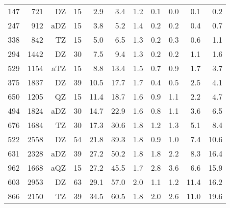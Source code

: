 \begin{table}[H]
\begin{tabular}{lrrrrrrrrrr}
 147 & 721&    DZ& 15&                 2.9&                 3.4 & 1.2 &                0.1 &                0.0 &                0.1 &                0.2\\  
 247 & 912&   aDZ& 15&                 3.8&                 5.2 & 1.4 &                0.2 &                0.2 &                0.4 &                0.7\\
 338 & 842&    TZ& 15&                 5.0&                 6.5 & 1.3 &                0.2 &                0.3 &                0.6 &                1.1\\
 294 &1442&    DZ& 30&                 7.5&                 9.4 & 1.3 &                0.2 &                0.2 &                1.1 &                1.6\\
 529 &1154&   aTZ& 15&                 8.8&                13.4 & 1.5 &                0.7 &                0.9 &                1.7 &                3.7\\
 375 &1837&    DZ& 39&                10.5&                17.7 & 1.7 &                0.4 &                0.5 &                2.5 &                4.1\\
 650 &1205&    QZ& 15&                11.4&                18.7 & 1.6 &                0.9 &                1.1 &                2.2 &                4.7\\
 494 &1824&   aDZ& 30&                14.7&                22.9 & 1.6 &                0.8 &                1.1 &                3.6 &                6.5\\
 676 &1684&    TZ& 30&                17.3&                30.6 & 1.8 &                1.2 &                1.3 &                5.1 &                8.4\\
 522 &2558&    DZ& 54&                21.8&                39.3 & 1.8 &                0.9 &                1.0 &                7.4 &               10.6\\
 631 &2328&   aDZ& 39&                27.2&                50.2 & 1.8 &                1.8 &                2.2 &                8.3 &               16.4\\
 962 &1668&   aQZ& 15&                27.2&                45.5 & 1.7 &                2.8 &                3.6 &                6.6 &               15.9\\
 603 &2953&    DZ& 63&                29.1&                57.0 & 2.0 &                1.1 &                1.2 &               11.4 &               16.2\\
 866 &2150&    TZ& 39&                34.5&                60.5 & 1.8 &                2.0 &                2.6 &               11.0 &               19.6\\

\end{tabular}
\end{table}
